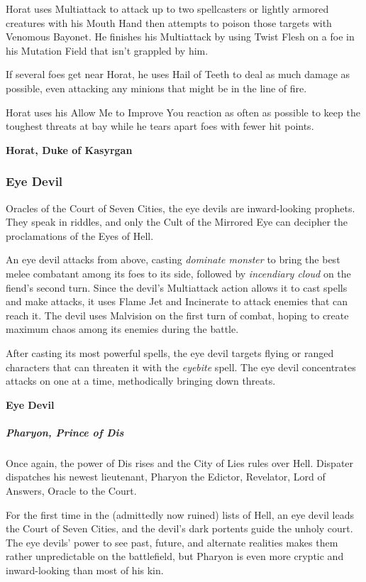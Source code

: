 \documentclass[10pt,a4paper,twoside,bg=print,twocolumn,openany,nodeprecatedcode]{dndbook}
\begin{document}
Horat uses Multiattack to attack up to two spellcasters or lightly armored creatures with his Mouth Hand then attempts to poison those targets with Venomous Bayonet. He finishes his Multiattack by using Twist Flesh on a foe in his Mutation Field that isn't grappled by him.

If several foes get near Horat, he uses Hail of Teeth to deal as much damage as possible, even attacking any minions that might be in the line of fire.

Horat uses his Allow Me to Improve You reaction as often as possible to keep the toughest threats at bay while he tears apart foes with fewer hit points.

\textbf{Horat, Duke of Kasyrgan}

\subsubsection{Eye Devil}
Oracles of the Court of Seven Cities, the eye devils are inward-looking prophets. They speak in riddles, and only the Cult of the Mirrored Eye can decipher the proclamations of the Eyes of Hell.

An eye devil attacks from above, casting \textit{dominate monster} to bring the best melee combatant among its foes to its side, followed by \textit{incendiary cloud} on the fiend's second turn. Since the devil's Multiattack action allows it to cast spells and make attacks, it uses Flame Jet and Incinerate to attack enemies that can reach it. The devil uses Malvision on the first turn of combat, hoping to create maximum chaos among its enemies during the battle.

After casting its most powerful spells, the eye devil targets flying or ranged characters that can threaten it with the \textit{eyebite} spell. The eye devil concentrates attacks on one at a time, methodically bringing down threats.

\textbf{Eye Devil}

\subparagraph{Pharyon, Prince of Dis}
Once again, the power of Dis rises and the City of Lies rules over Hell. Dispater dispatches his newest lieutenant, Pharyon the Edictor, Revelator, Lord of Answers, Oracle to the Court.

For the first time in the (admittedly now ruined) lists of Hell, an eye devil leads the Court of Seven Cities, and the devil's dark portents guide the unholy court. The eye devils' power to see past, future, and alternate realities makes them rather unpredictable on the battlefield, but Pharyon is even more cryptic and inward-looking than most of his kin.
\end{document}

